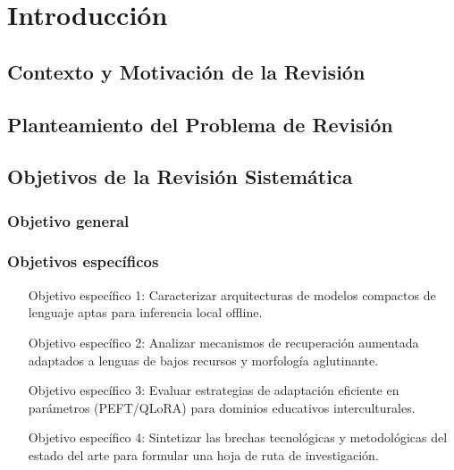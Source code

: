 
\section{Introducción}
\label{sec:introduccion}

\subsection{Contexto y Motivación de la Revisión}

\subsection{Planteamiento del Problema de Revisión}

\subsection{Objetivos de la Revisión Sistemática}

\subsubsection{Objetivo general}

\subsubsection{Objetivos específicos}
\begin{enumerate}[(a)]
	\item [Objetivo específico 1: Caracterizar arquitecturas de modelos compactos de lenguaje aptas para inferencia local offline.]
	\item [Objetivo específico 2: Analizar mecanismos de recuperación aumentada adaptados a lenguas de bajos recursos y morfología aglutinante.]
	\item [Objetivo específico 3: Evaluar estrategias de adaptación eficiente en parámetros (PEFT/QLoRA) para dominios educativos interculturales.]
	\item [Objetivo específico 4: Sintetizar las brechas tecnológicas y metodológicas del estado del arte para formular una hoja de ruta de investigación.]
\end{enumerate}

